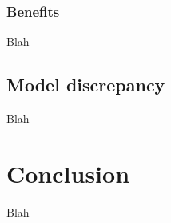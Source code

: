 \documentclass{article}
\begin{document}
\subsubsection{Benefits}
Blah

\subsection{Model discrepancy}
Blah

\section{Conclusion}
Blah














%
\end{document}
